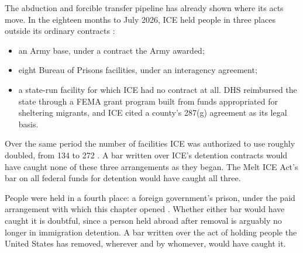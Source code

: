 The abduction and forcible transfer pipeline has already shown where its acts move. In the eighteen months to July 2026, ICE held people in three places outside its ordinary contracts \autocite{gao2026detention}:

\begin{itemize}
\item an Army base, under a contract the Army awarded;
\item eight Bureau of Prisons facilities, under an interagency agreement;
\item a state-run facility for which ICE had no contract at all. DHS reimbursed the state through a FEMA grant program built from funds appropriated for sheltering migrants, and ICE cited a county's 287(g) agreement as its legal basis.
\end{itemize}

Over the same period the number of facilities ICE was authorized to use roughly doubled, from 134 to 272 \autocite{gao2026detention}. A bar written over ICE's detention contracts would have caught none of these three arrangements as they began. The Melt ICE Act's bar on all federal funds for detention would have caught all three.

People were held in a fourth place: a foreign government's prison, under the paid arrangement with which this chapter opened \autocite{Renteria2025ElSalvador}. Whether either bar would have caught it is doubtful, since a person held abroad after removal is arguably no longer in immigration detention. A bar written over the act of holding people the United States has removed, wherever and by whomever, would have caught it.

